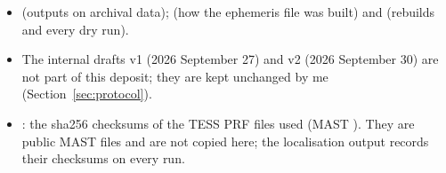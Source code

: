 \begin{itemize}
   (levels), ,
   and  (measured false-alarm levels,
  Appendix~\ref{app:fa}).
\item {} (outputs on archival data);  (how the ephemeris file was built) and
   (rebuilds  and every dry run).
\item The internal drafts v1 (2026 September 27) and v2 (2026 September 30) are not part of this deposit; they are kept
  unchanged by me (Section~\ref{sec:protocol}).
\item {}: the sha256 checksums of the TESS PRF files used (MAST
  ). They are public MAST files and are not copied here; the localisation
  output records their checksums on every run.
\end{itemize}
